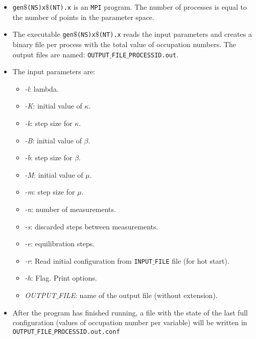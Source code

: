 \documentclass[a4paper,10pt]{report}
\begin{document}
\begin{itemize}[leftmargin=*]
 \begin{itemize}[leftmargin=*]
  \item {\tt gen$\$$(NS)x$\$$(NT).x} is an {\tt MPI} program.  The number of processes is equal
  to the number of points in the parameter space.
  \item The executable {\tt gen$\$$(NS)x$\$$(NT).x} reads the input parameters 
  and creates a binary file per process with the total value of occupation numbers.
  The output files are named: {\tt OUTPUT$\_$FILE$\_$PROCESSID.out}.
  \item The input parameters are:
  \begin{itemize}[leftmargin=*]
   \item {\it -l}: lambda.
   \item {\it -K}: initial value of $\kappa$.
   \item {\it -k}: step size for $\kappa$.
   \item {\it -B}: initial value of $\beta$.
   \item {\it -b}: step size for $\beta$.
   \item {\it -M}: initial value of $\mu$.
   \item {\it -m}: step size for $\mu$.
   \item {\it -n}: number of measurements.
   \item {\it -s}: discarded steps between measurements.
   \item {\it -e}: equilibration steps.
   \item {\it -r}: Read initial configuration from {\tt INPUT$\_$FILE} file (for hot start).
   \item {\it -h}: Flag. Print options.
   \item {\it OUTPUT$\_$FILE}: name of the output file (without extension).
  \end{itemize}
  
  \item After the program has finished running, a file with the state of the last full configuration 
  (values of occupation number per variable) will be written in {\tt OUTPUT$\_$FILE$\_$PROCESSID.out.conf}
  

\end{itemize}
\end{itemize}
\end{document}
